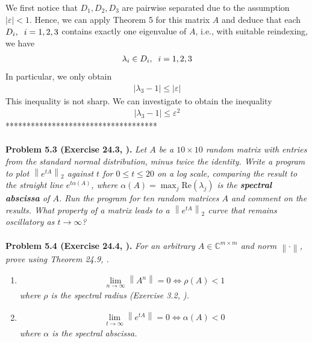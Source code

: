 \documentclass[a4paper,oneside]{book}
\numberwithin{equation}{chapter}
\begin{document}
We first notice that $D_1,D_2,D_3$ are pairwise separated due to the assumption $\left|\varepsilon\right|<1$. Hence, we can apply Theorem 5 for this matrix $A$ and deduce that each $D_i,\hspace{0.2cm} i=1,2,3$ contains exactly one eigenvalue of $A$, i.e., with suitable reindexing, we have
\begin{align}
{\lambda _i} \in {D_i},\hspace{0.2cm} i = 1,2,3
\end{align} 
In particular, we only obtain
\begin{align}
\left| {{\lambda _3} - 1} \right| \le \left| \varepsilon  \right|
\end{align}
This inequality is not sharp. We can investigate to obtain the inequality 
\begin{align}
\left| {{\lambda _3} - 1} \right| \le {\varepsilon ^2}
\end{align}
************************************\\
\\
\textbf{Problem 5.3 (Exercise 24.3, \cite{1}).} \textit{Let $A$ be a $10\times 10$ random matrix with entries from the standard normal distribution, minus twice the identity. Write a program to plot $\left\|e^{tA}\right\| _2$ against $t$ for $0\le t\le 20$ on a log scale, comparing the result to the straight line $e^{t\alpha \left(A\right)}$, where $\alpha \left(A\right) =\max _j\mbox{Re} \left(\lambda _j\right)$ is the \textbf{spectral abscissa} of $A$. Run the program for ten random matrices $A$ and comment on the results. What property of a matrix leads to a $\left\|e^{tA}\right\| _2$ curve that remains oscillatory as $t\to \infty$?}\\
\\
\textbf{Problem 5.4 (Exercise 24.4, \cite{1}).} \textit{For an arbitrary $A\in \mathbb{C}^{m\times m}$ and norm $\left\|\cdot \right\|$, prove using Theorem 24.9, \cite{1}.}
\begin{enumerate}
\item
\begin{align}
\mathop {\lim }\limits_{n \to \infty } \left\| {{A^n}} \right\| = 0 \Leftrightarrow \rho \left( A \right) < 1
\end{align}
\textit{where $\rho$ is the spectral radius (Exercise 3.2, \cite{1}).}
\item 
\begin{align}
\mathop {\lim }\limits_{t \to \infty } \left\| {{e^{tA}}} \right\| = 0 \Leftrightarrow \alpha \left( A \right) < 0
\end{align}
\textit{where $\alpha$ is the spectral abscissa.}
\end{enumerate}
\end{document}
